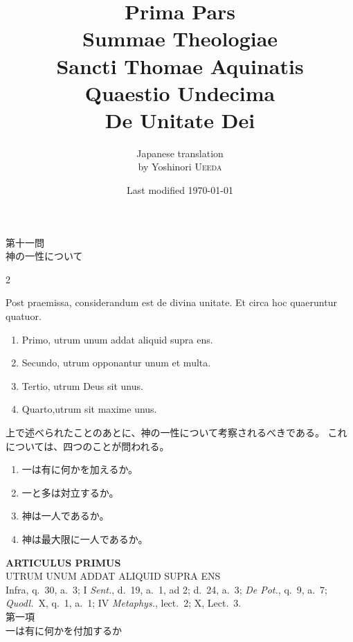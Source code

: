 \documentclass[paper=a4paper,fontsize=10pt,jafontsize=9pt,titlepage]{jlreq}
\title{{\bfseries Prima Pars}\\{\Huge Summae Theologiae}\\Sancti Thomae
Aquinatis\\Quaestio Undecima\\{\bfseries De Unitate Dei}}
\author{Japanese translation\\by Yoshinori {\scshape Ueeda}}
\date{Last modified \today}
\begin{document}
\maketitle
\begin{center}
 {\Large 第十一問\\神の一性について}
\end{center}



\begin{paracol}{2}

Post praemissa, considerandum est de divina unitate. Et circa hoc
quaeruntur quatuor. 
\begin{enumerate}
 \item Primo, utrum unum addat aliquid supra ens.
 \item Secundo, utrum opponantur unum et multa.
 \item Tertio, utrum Deus sit unus.
 \item Quarto,utrum sit maxime unus.
\end{enumerate}

\switchcolumn

上で述べられたことのあとに、神の一性について考察されるべきである。
これについては、四つのことが問われる。
\begin{enumerate}
 \item 一は有に何かを加えるか。
 \item 一と多は対立するか。
 \item 神は一人であるか。
 \item 神は最大限に一人であるか。
\end{enumerate}

\end{paracol}
\newpage
{}

\begin{center}
 {\Large {\bfseries ARTICULUS PRIMUS}}\\
 {\large UTRUM UNUM ADDAT ALIQUID SUPRA ENS}\\
 {\footnotesize Infra, q.~30, a.~3; I {\itshape Sent.}, d.~19, a.~1, ad
 2; d.~24, a.~3; {\itshape De Pot.}, q.~9, a.~7; {\itshape Quodl.}~X,
 q.~1, a.~1; IV {\itshape Metaphys.}, lect.~2; X, Lect.~3.}\\
 {\Large 第一項\\一は有に何かを付加するか}
\end{center}



{}
\setcounter{section}{1}
\setcounter{subsection}{0}
\end{document}
